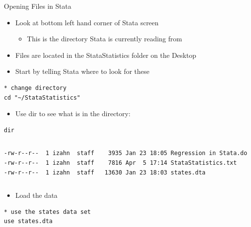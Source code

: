 \documentclass[table,smaller]{beamer}
\begin{document}
\begin{frame}[fragile,label=sec-1-4]{Opening Files in Stata}
 \begin{itemize}
\item Look at bottom left hand corner of Stata screen
\begin{itemize}
\item This is the directory Stata is currently reading from
\end{itemize}
\item Files are located in the StataStatistics folder on the Desktop
\item Start by telling Stata where to look for these
\end{itemize}

\begin{verbatim}
* change directory
cd "~/StataStatistics"
\end{verbatim}


\begin{itemize}
\item Use dir to see what is in the directory:
\end{itemize}


\begin{verbatim}
dir
\end{verbatim}


\vspace{-.5em}
\begin{columns}
\begin{block}{}
\begin{verbatim}
-rw-r--r--  1 izahn  staff    3935 Jan 23 18:05 Regression in Stata.do
-rw-r--r--  1 izahn  staff    7816 Apr  5 17:14 StataStatistics.txt
-rw-r--r--  1 izahn  staff   13630 Jan 23 18:03 states.dta
\end{verbatim}
\end{block}
\end{columns}
\vspace{.5em}

\begin{itemize}
\item Load the data
\end{itemize}

\begin{verbatim}
* use the states data set
use states.dta
\end{verbatim}
\end{frame}
\end{document}
